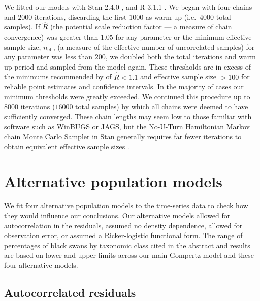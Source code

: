 We fitted our models with Stan 2.4.0 \citep{stan-manual2014}, and R 3.1.1 \citep{r2014}. We began with four chains and $2000$ iterations, discarding the first $1000$ as warm up (i.e.~4000 total samples). If $\hat{R}$ (the potential scale reduction factor --- a measure of chain convergence) was greater than $1.05$ for any parameter or the minimum effective sample size, $n_\mathrm{eff}$, (a measure of the effective number of uncorrelated samples) for any parameter was less than $200$, we doubled both the total iterations and warm up period and sampled from the model again. These thresholds are in excess of the minimums recommended by \citet{gelman2006a} of $\hat{R} < 1.1$ and effective sample size $> 100$ for reliable point estimates and confidence intervals. In the majority of cases our minimum thresholds were greatly exceeded. We continued this procedure up to $8000$ iterations ($16000$ total samples) by which all chains were deemed to have sufficiently converged. These chain lengths may seem low to those familiar with software such as WinBUGS or JAGS, but the No-U-Turn Hamiltonian Markov chain Monte Carlo Sampler in Stan generally requires far fewer iterations to obtain equivalent effective sample sizes \citep{stan-manual2014}.

\section{Alternative population models}

We fit four alternative population models to the time-series data to check how they would influence our conclusions. Our alternative models allowed for autocorrelation in the residuals, assumed no density dependence, allowed for observation error, or assumed a Ricker-logistic functional form. The range of percentages of black swans by taxonomic class cited in the abstract and results are based on lower and upper limits across our main Gompertz model and these four alternative models.

\subsection{Autocorrelated residuals}

